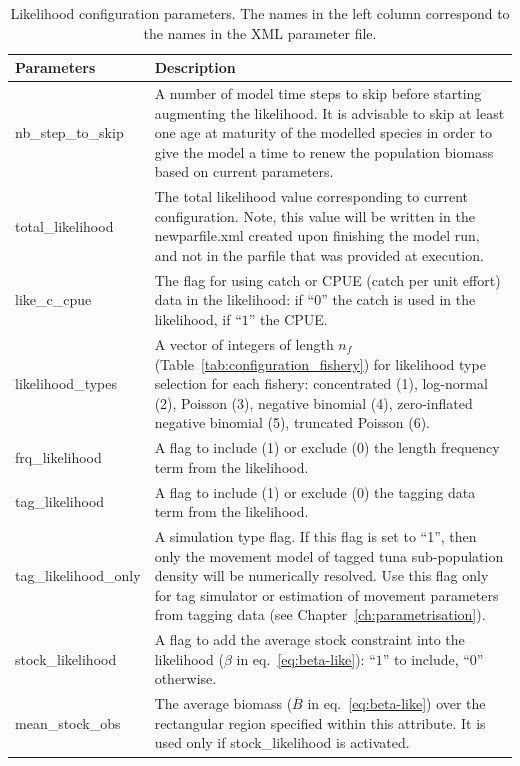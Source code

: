 \begin{table}[H]
\caption{Likelihood configuration parameters. The names in the left column correspond to the names in the XML parameter file.}
\begin{tabular}{p{4.5cm}p{11.2cm}}
    \hline
    {\bfseries Parameters} & {\bfseries Description}\\ \hline\hline
    {\ttfamily nb\_step\_to\_skip} & A number of model time steps to skip before starting augmenting the likelihood. It is advisable to skip at least one age at maturity of the modelled species in order to give the model a time to renew the population biomass based on current parameters. \\\hline
    {\ttfamily total\_likelihood} & The total likelihood value corresponding to current configuration. Note, this value will be written in the {\ttfamily newparfile.xml} created upon finishing the model run, and not in the parfile that was provided at execution. \\\hline
    {\ttfamily like\_c\_cpue} & The flag for using catch or CPUE (catch per unit effort) data in the likelihood: if ``$0$'' the catch is used in the likelihood, if ``$1$'' the CPUE.\\\hline
    {\ttfamily likelihood\_types}& A vector of integers of length $n_f$ (Table~\ref{tab:configuration_fishery}) for likelihood type selection for each fishery: concentrated (1), log-normal (2), Poisson (3), negative binomial (4), zero-inflated negative binomial (5), truncated Poisson (6). \\ \hline
    {\ttfamily frq\_likelihood} & A flag to include (1) or exclude (0) the length frequency term from the likelihood. \\ \hline
    {\ttfamily tag\_likelihood} & A flag to include (1) or exclude (0) the tagging data term from the likelihood. \\ \hline
    {\ttfamily tag\_likelihood\_only} & A simulation type flag. If this flag is set to ``1'', then only the movement model of tagged tuna sub-population density will be numerically resolved. Use this flag only for tag simulator or estimation of movement parameters from tagging data (see Chapter~\ref{ch:parametrisation}).\\ \hline
    {\ttfamily stock\_likelihood} & A flag to add the average stock constraint into the likelihood ($\beta$ in eq.~\ref{eq:beta-like}): ``$1$'' to include, ``$0$'' otherwise. \\ \hline 
    {\ttfamily mean\_stock\_obs} & The average biomass ($\overline{B}$ in eq.~\ref{eq:beta-like}) over the rectangular region specified within this attribute. It is used only if {\ttfamily stock\_likelihood} is activated. \\ \hline

\end{tabular}
\end{table}
